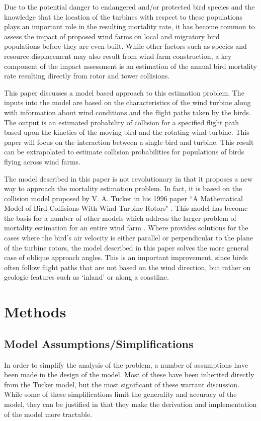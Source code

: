 \label{} \documentclass[10pt,conference]{IEEEtran}
\begin{document}
Due to the potential danger to endangered and/or protected bird species and the knowledge that the location of the
turbines with respect to these populations plays an important role in the resulting mortality rate, it has become
common to assess the impact of proposed wind farms on local and migratory bird populations before they are even built.
While other factors such as species and resource displacement may also result from wind farm construction, a key
component of the impact assessment is an estimation of the annual bird mortality rate resulting directly from rotor and
tower collisions.

This paper discusses a model based approach to this estimation problem. The inputs into the model are based on the
characteristics of the wind turbine along with information about wind conditions and the flight paths taken by the
birds. The output is an estimated probability of collision for a specified flight path based upon the kinetics of the
moving bird and the rotating wind turbine. This paper will focus on the interaction between a single bird and turbine.
This result can be extrapolated to estimate collision probabilities for populations of birds flying across wind farms.

The model described in this paper is not revolutionary in that it proposes a new way to approach the mortality
estimation problem. In fact, it is based on the collision model proposed by V. A. Tucker in his 1996 paper ``A
Mathematical Model of Bird Collisions With Wind Turbine Rotors" \cite{Tucker1996}. This model has become the basis for
a number of other models which address the larger problem of mortality estimation for an entire wind farm
\cite{Cooper2004}\cite{Madders2006}. Where \cite{Tucker1996} provides solutions for the cases where the bird's air
velocity is either parallel or perpendicular to the plane of the turbine rotors, the model described in this paper
solves the more general case of oblique approach angles. This is an important improvement, since birds often follow
flight paths that are not based on the wind direction, but rather on geologic features such as `inland' or along a
coastline.

\section{Methods}
\subsection{Model Assumptions/Simplifications}
In order to simplify the analysis of the problem, a number of assumptions have been made in the design of the model.
Most of these have been inherited directly from the Tucker model, but the most significant of these warrant discussion.
While some of these simplifications limit the generality and accuracy of the model, they can be justified in that they
make the derivation and implementation of the model more tractable.
\end{document}

